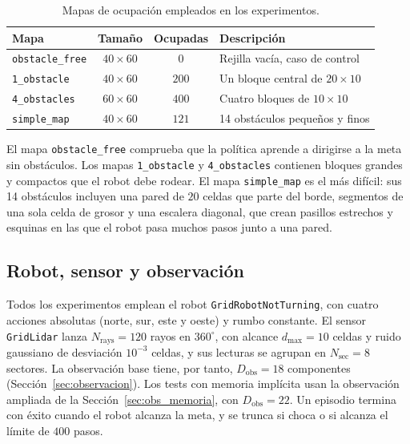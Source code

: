 \begin{table}[htbp]
    \centering
    \caption[Mapas de ocupación de los experimentos]{Mapas de ocupación
    empleados en los experimentos.}
    \label{tab:mapas}
    \begin{tabular}{lccl}
        \toprule
        \textbf{Mapa} & \textbf{Tamaño} & \textbf{Ocupadas} & \textbf{Descripción} \\
        \midrule
        \texttt{obstacle\_free} & $40 \times 60$ & $0$ & Rejilla vacía, caso de control \\
        \texttt{1\_obstacle} & $40 \times 60$ & $200$ & Un bloque central de $20 \times 10$ \\
        \texttt{4\_obstacles} & $60 \times 60$ & $400$ & Cuatro bloques de $10 \times 10$ \\
        \texttt{simple\_map} & $40 \times 60$ & $121$ & 14 obstáculos pequeños y finos \\
        \bottomrule
    \end{tabular}
\end{table}

El mapa \texttt{obstacle\_free} comprueba que la política aprende a
dirigirse a la meta sin obstáculos. Los mapas \texttt{1\_obstacle} y
\texttt{4\_obstacles} contienen bloques grandes y compactos que el robot
debe rodear. El mapa \texttt{simple\_map} es el más difícil: sus 14
obstáculos incluyen una pared de $20$ celdas que parte del borde,
segmentos de una sola celda de grosor y una escalera diagonal, que crean
pasillos estrechos y esquinas en las que el robot pasa muchos pasos junto
a una pared.

\subsection{Robot, sensor y observación}
Todos los experimentos emplean el robot \texttt{GridRobotNotTurning}, con
cuatro acciones absolutas (norte, sur, este y oeste) y rumbo constante.
El sensor \texttt{GridLidar} lanza $N_{\text{rays}} = 120$ rayos en
$360^\circ$, con alcance $d_{\max} = 10$ celdas y ruido gaussiano de
desviación $10^{-3}$ celdas, y sus lecturas se agrupan en
$N_{\text{sec}} = 8$ sectores. La observación base tiene, por tanto,
$D_{\text{obs}} = 18$ componentes (Sección~\ref{sec:observacion}). Los
tests con memoria implícita usan la observación ampliada de la
Sección~\ref{sec:obs_memoria}, con $D_{\text{obs}} = 22$. Un episodio
termina con éxito cuando el robot alcanza la meta, y se trunca si choca o
si alcanza el límite de $400$ pasos.

